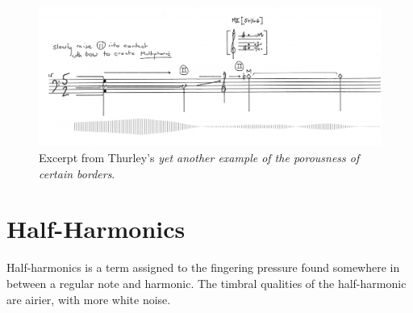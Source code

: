   \begin{figure}
    \includegraphics[width=\linewidth]{./resources/thurleyMultiphonicNotation.png}
    \caption{Excerpt from Thurley's \emph{yet another example of the porousness of certain borders}.}
\label{fig:Excerpt from Thurley's `yet another example of the porousness of certain borders'}
  \end{figure}

\section{Half-Harmonics}
Half-harmonics is a term assigned to the fingering pressure found somewhere in between a regular note and harmonic. The timbral qualities of the half-harmonic are airier, with more white noise.
